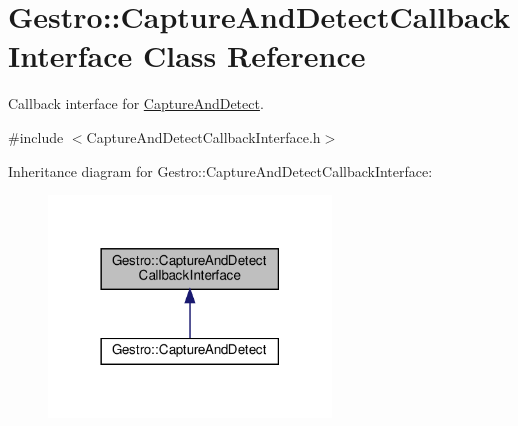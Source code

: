 \hypertarget{classGestro_1_1CaptureAndDetectCallbackInterface}{}\section{Gestro\+:\+:Capture\+And\+Detect\+Callback\+Interface Class Reference}
\label{classGestro_1_1CaptureAndDetectCallbackInterface}


Callback interface for \hyperlink{classGestro_1_1CaptureAndDetect}{Capture\+And\+Detect}.  




{\ttfamily \#include $<$Capture\+And\+Detect\+Callback\+Interface.\+h$>$}



Inheritance diagram for Gestro\+:\+:Capture\+And\+Detect\+Callback\+Interface\+:
\nopagebreak
\begin{figure}[H]
\begin{center}
\leavevmode
\includegraphics[width=213pt]{classGestro_1_1CaptureAndDetectCallbackInterface__inherit__graph}
\end{center}
\end{figure}
